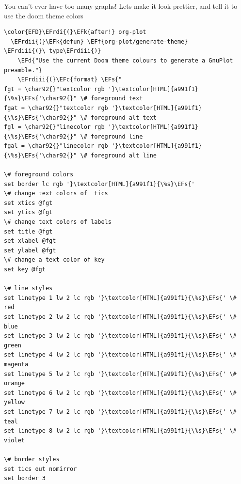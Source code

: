 \documentclass{scrartcl}
\newcommand{\EFk}[1]{\textcolor{EFk}{#1}} %
\newcommand{\EFd}[1]{\textcolor{EFd}{#1}} %
\newcommand{\EFs}[1]{\textcolor{EFs}{#1}} %
\newcommand{\EFc}[1]{\textcolor{EFc}{#1}} %
\newcommand{\EFf}[1]{\textcolor{EFf}{#1}} %
\newcommand{\EFrdi}[1]{#1} %
\newcommand{\EFrdii}[1]{#1} %
\newcommand{\EFrdiii}[1]{#1} %
\begin{document}
You can't ever have too many graphs! Lets make it look prettier, and tell it to use the doom theme colors
\begin{Code}
\begin{Verbatim}[]
\color{EFD}\EFrdi{(}\EFk{after!} org-plot
  \EFrdii{(}\EFk{defun} \EFf{org-plot/generate-theme} \EFrdiii{(}\_type\EFrdiii{)}
    \EFd{"Use the current Doom theme colours to generate a GnuPlot preamble."}
    \EFrdiii{(}\EFc{format} \EFs{"
fgt = \char92{}"textcolor rgb '}\textcolor[HTML]{a991f1}{\%s}\EFs{'\char92{}" \# foreground text
fgat = \char92{}"textcolor rgb '}\textcolor[HTML]{a991f1}{\%s}\EFs{'\char92{}" \# foreground alt text
fgl = \char92{}"linecolor rgb '}\textcolor[HTML]{a991f1}{\%s}\EFs{'\char92{}" \# foreground line
fgal = \char92{}"linecolor rgb '}\textcolor[HTML]{a991f1}{\%s}\EFs{'\char92{}" \# foreground alt line

\# foreground colors
set border lc rgb '}\textcolor[HTML]{a991f1}{\%s}\EFs{'
\# change text colors of  tics
set xtics @fgt
set ytics @fgt
\# change text colors of labels
set title @fgt
set xlabel @fgt
set ylabel @fgt
\# change a text color of key
set key @fgt

\# line styles
set linetype 1 lw 2 lc rgb '}\textcolor[HTML]{a991f1}{\%s}\EFs{' \# red
set linetype 2 lw 2 lc rgb '}\textcolor[HTML]{a991f1}{\%s}\EFs{' \# blue
set linetype 3 lw 2 lc rgb '}\textcolor[HTML]{a991f1}{\%s}\EFs{' \# green
set linetype 4 lw 2 lc rgb '}\textcolor[HTML]{a991f1}{\%s}\EFs{' \# magenta
set linetype 5 lw 2 lc rgb '}\textcolor[HTML]{a991f1}{\%s}\EFs{' \# orange
set linetype 6 lw 2 lc rgb '}\textcolor[HTML]{a991f1}{\%s}\EFs{' \# yellow
set linetype 7 lw 2 lc rgb '}\textcolor[HTML]{a991f1}{\%s}\EFs{' \# teal
set linetype 8 lw 2 lc rgb '}\textcolor[HTML]{a991f1}{\%s}\EFs{' \# violet

\# border styles
set tics out nomirror
set border 3


\end{Verbatim}
\end{Code}
\end{document}
